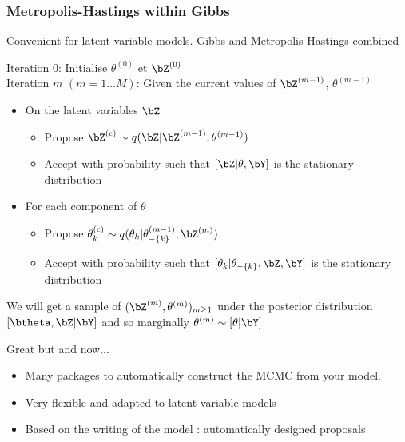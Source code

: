 \begin{frame}\frametitle{Metropolis-Hastings within Gibbs} 

 Convenient for latent variable models. Gibbs and Metropolis-Hastings combined
 
 \begin{block}{}
\vert Iteration 0:  \noir Initialise $\theta^{(0)}$  et $\bZ^{(0)}$\\

\vert Iteration $m$ $(m=1\dots M)$: \noir  Given the current values of $\bZ^{(m-1)}$, $\theta^{(m-1)}$
\begin{itemize}
 \item On the latent variables $\bZ$
        \begin{itemize}
        \item Propose $\bZ^{(c)} \sim q(\bZ| \bZ^{(m-1)},\theta^{(m-1)})$
        \item Accept with probability such that $[\bZ  |\theta  , \bY]$ is the stationary distribution 
        \end{itemize}
\item For each component of $\theta$
         \begin{itemize}
          \item Propose $\theta_k^{(c)} \sim q(\theta_k| \theta^{(m-1)}_{-\{k\}}, \bZ^{(m)})$
            \item Accept with probability such that $[\theta_k |\theta_{-\{k\}}, \bZ, \bY]$ is the stationary distribution  %
        \end{itemize}
\end{itemize}
\end{block}
We will get a sample of $(\bZ^{(m)}, \theta^{(m)})_{m \geq 1}$ under the posterior distribution  $[\btheta, \bZ  | \bY]$ and so marginally $\theta^{(m)} \sim [\theta | \bY]$

 \end{frame}
  
 \begin{frame}{ Great but and now...}
 \begin{itemize}
  \item Many packages to automatically construct the MCMC from your model. 
  \item Very flexible and adapted to latent variable models
  \item Based on the writing of the model : automatically designed proposals
 \end{itemize}
 
  \end{frame}
  
